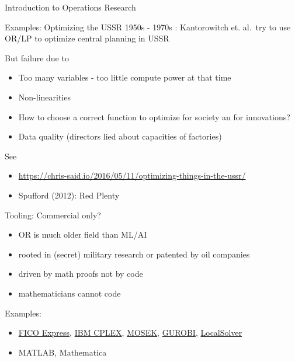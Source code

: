 \documentclass[
  ignorenonframetext,
]{beamer}
\providecommand{\tightlist}{%
  \setlength{\itemsep}{0pt}\setlength{\parskip}{0pt}}\usepackage{longtable,booktabs,array}
\begin{document}
\begin{frame}{Introduction to Operations Research}
\begin{block}{Examples: Optimizing the USSR}
\protect\hypertarget{examples-optimizing-the-ussr}{}
1950s - 1970s : Kantorowitch et. al.~try to use OR/LP to optimize
central planning in USSR

But failure due to

\begin{itemize}
\tightlist
\item
  Too many variables - too little compute power at that time
\item
  Non-linearities
\item
  How to choose a correct function to optimize for society an for
  innovations?
\item
  Data quality (directors lied about capacities of factories)
\end{itemize}

See

\begin{itemize}
\tightlist
\item
  \url{https://chris-said.io/2016/05/11/optimizing-things-in-the-ussr/}
\item
  Spufford (2012): Red Plenty
\end{itemize}
\end{block}

\begin{block}{Tooling: Commercial only?}
\protect\hypertarget{tooling-commercial-only}{}
\begin{itemize}
\tightlist
\item
  OR is much older field than ML/AI
\item
  rooted in (secret) military research or patented by oil companies
\item
  driven by math proofs not by code
\item
  mathematicians cannot code
\end{itemize}

Examples:

\begin{itemize}
\tightlist
\item
  \href{https://www.fico.com/en/products/fico-xpress-optimization}{FICO
  Express},
  \href{https://www.ibm.com/products/ilog-cplex-optimization-studio}{IBM
  CPLEX}, \href{https://www.mosek.com/}{MOSEK},
  \href{https://www.gurobi.com/}{GUROBI},
  \href{https://www.localsolver.com/}{LocalSolver}
\item
  MATLAB, Mathematica
\end{itemize}


\end{block}
\end{frame}
\end{document}
